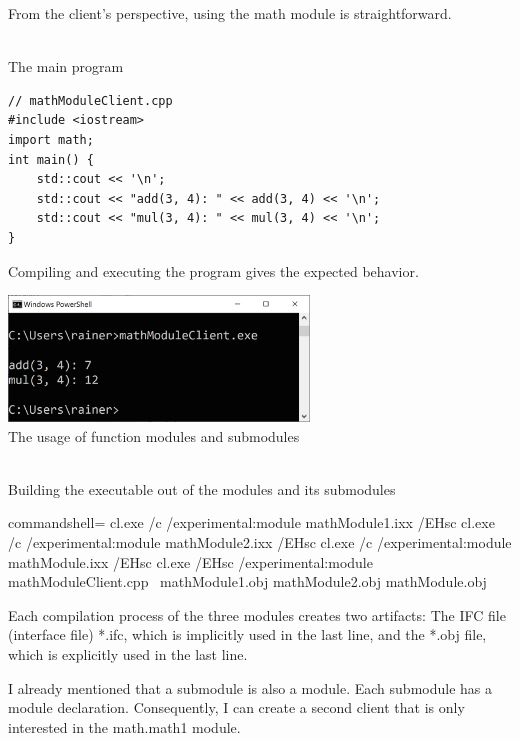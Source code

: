 From the client’s perspective, using the math module is straightforward.

\hspace*{\fill} \\ %
\noindent
The main program
\begin{lstlisting}[style=styleCXX]
// mathModuleClient.cpp
#include <iostream>
import math;
int main() {
	std::cout << '\n';
	std::cout << "add(3, 4): " << add(3, 4) << '\n';
	std::cout << "mul(3, 4): " << mul(3, 4) << '\n';
}
\end{lstlisting}

Compiling and executing the program gives the expected behavior.

\begin{center}
\includegraphics[width=0.6\textwidth]{content/3/chapter4/images/21.png}\\
The usage of function modules and submodules
\end{center}

\begin{tcolorbox}[colback=blue!5!white,colframe=blue!75!black,title=Building the Executable with the Microsoft Compiler]
	
\hspace*{\fill} \\ %
\noindent
Building the executable out of the modules and its submodules
\begin{tcblisting}{commandshell={}}
cl.exe /c /experimental:module mathModule1.ixx /EHsc
cl.exe /c /experimental:module mathModule2.ixx /EHsc
cl.exe /c /experimental:module mathModule.ixx /EHsc
cl.exe /EHsc /experimental:module mathModuleClient.cpp \
  mathModule1.obj mathModule2.obj mathModule.obj
\end{tcblisting}

Each compilation process of the three modules creates two artifacts: The IFC file (interface file) *.ifc, which is implicitly used in the last line, and the *.obj file, which is explicitly used in the last line.

\end{tcolorbox}

I already mentioned that a submodule is also a module. Each submodule has a module declaration. Consequently, I can create a second client that is only interested in the math.math1 module.

